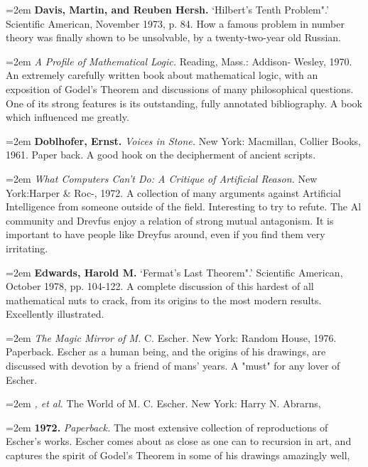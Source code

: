 \par\noindent\hangindent=2em {\bf Davis, Martin, and Reuben Hersh.} `Hilbert's Tenth Problem".' Scientific American, November 1973, p. 84. How a famous problem in number theory was finally shown to be unsolvable, by a twenty-two-year old Russian.

\par\noindent\hangindent=2em  {\it A Profile of Mathematical Logic.} Reading, Mass.: Addison- Wesley, 1970. An extremely carefully written book about mathematical logic, with an exposition of Godel's Theorem and discussions of many philosophical questions. One of its strong features is its outstanding, fully annotated bibliography. A book which influenced me greatly.

\par\noindent\hangindent=2em {\bf Doblhofer, Ernst.} {\it Voices in Stone.} New York: Macmillan, Collier Books, 1961. Paper back. A good hook on the decipherment of ancient scripts.

\par\noindent\hangindent=2em  {\it What Computers Can't Do: A Critique of Artificial Reason.} New York:Harper \& Roc-, 1972. A collection of many arguments against Artificial Intelligence from someone outside of the field. Interesting to try to refute. The Al community and Drevfus enjoy a relation of strong mutual antagonism. It is important to have people like Dreyfus around, even if you find them very irritating.

\par\noindent\hangindent=2em {\bf Edwards, Harold M.} `Fermat's Last Theorem".' Scientific American, October 1978, pp. 104-122. A complete discussion of this hardest of all mathematical nuts to crack, from its origins to the most modern results. Excellently illustrated.

\par\noindent\hangindent=2em  {\it The Magic Mirror of M.} C. Escher. New York: Random House, 1976. Paperback. Escher as a human being, and the origins of his drawings, are discussed with devotion by a friend of mans' years. A "must" for any lover of Escher.

\par\noindent\hangindent=2em  {\it , et al.} The World of M. C. Escher. New York: Harry N. Abrarns,

\par\noindent\hangindent=2em {\bf 1972.} {\it Paperback.} The most extensive collection of reproductions of Escher's works. Escher comes about as close as one can to recursion in art, and captures the spirit of Godel's Theorem in some of his drawings amazingly well,

